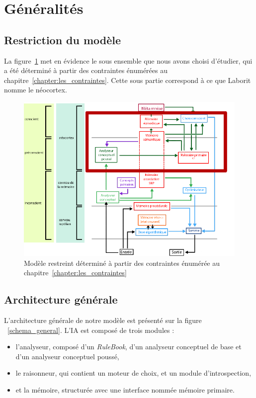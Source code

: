 \section{Généralités}

\subsection{Restriction du modèle}

La figure~\ref{modele_restreint} met en évidence le sous ensemble que nous avons choisi d'étudier, qui a été déterminé à partir des contraintes énumérées au chapitre~\ref{chapter:les_contraintes}. Cette sous partie correspond à ce que Laborit nomme le néocortex.

\begin{figure}[H] 
\includegraphics[width=\textwidth]{files/modele_restreint} 
\caption{Modèle restreint déterminé à partir des contraintes énumérée au chapitre~\ref{chapter:les_contraintes}} 
\label{modele_restreint}
\end{figure}

\subsection{Architecture générale}

L'architecture générale de notre modèle est présenté sur la figure ~\ref{schema_general}. L'IA est composé de trois modules :
\begin{itemize}
\item l'analyseur, composé d'un \emph{RuleBook}, d'un analyseur conceptuel de base et d'un analyseur conceptuel poussé,
\item le raisonneur, qui contient un moteur de choix, et un module d'introspection,
\item et la mémoire, structurée avec une interface nommée mémoire primaire.
\end{itemize}

